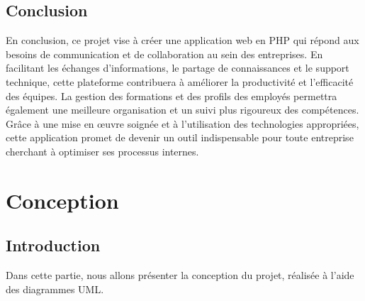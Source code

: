 \documentclass{article}
\begin{document}
        \subsection{Conclusion}
            En conclusion, ce projet vise à créer une application web en PHP qui répond aux besoins de communication et de collaboration au sein des entreprises. En facilitant les échanges d'informations, le partage de connaissances et le support technique, cette plateforme contribuera à améliorer la productivité et l'efficacité des équipes. La gestion des formations et des profils des employés permettra également une meilleure organisation et un suivi plus rigoureux des compétences. Grâce à une mise en œuvre soignée et à l'utilisation des technologies appropriées, cette application promet de devenir un outil indispensable pour toute entreprise cherchant à optimiser ses processus internes.

    \section{Conception}
        \subsection{Introduction}
            Dans cette partie, nous allons présenter la conception du projet, réalisée à l'aide des diagrammes UML.
\end{document}
